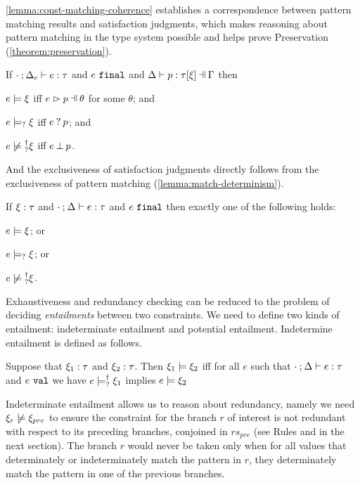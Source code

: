 \autoref{lemma:const-matching-coherence} establishes a correspondence
between pattern matching results and satisfaction judgments, which makes
reasoning about pattern matching in the type system possible and helps prove Preservation (\autoref{theorem:preservation}).

\begin{lemma}
  \label{lemma:const-matching-coherence}
  If $\cdot \mathbin{;} \Delta_e \vdash e : \tau$ and $e ~\mathtt{final}$ and $\chpattyp{p}{\tau}{\xi}{\Gamma}{\Delta}$ then
  \begin{enumerate*}
  \item $e \models \xi$ iff $\hpatmatch{e}{p}{\theta}$ for some $\theta$; and 
  \item $e \models_{?} \xi$ iff $e \mathbin{?} p$; and 
  \item $\cnotsatisfyormay{e}{\xi}$ iff $e \mathbin{\bot} p$.
  \end{enumerate*}
\end{lemma}

And the exclusiveness of satisfaction judgments directly follows from the exclusiveness of pattern matching (\autoref{lemma:match-determinism}).
\begin{theorem}
  \label{theorem:exclusive-constraint-satisfaction}
  If $\xi : \tau$ and $\cdot \mathbin{;} \Delta \vdash e : \tau$ and $e ~\mathtt{final}$ then exactly one of the following holds:
  \begin{enumerate*}
  \item $e \models \xi$; or
  \item $e \models_{?} \xi$; or 
  \item $\cnotsatisfyormay{e}{\xi}$.
  \end{enumerate*}
\end{theorem}

Exhaustiveness and redundancy checking can be reduced to the problem of deciding \emph{entailments} between two constraints. We need to define two kinds of entailment: indeterminate entailment and potential entailment.
Indetermine entailment is defined as follows.
\begin{definition}
  \label{definition:const-entailment}
  Suppose that $\xi_1 : \tau$ and $\xi_2 : \tau$.
  Then $\xi_1 \models \xi_2$ iff for all $e$ such that $\cdot \mathbin{;} \Delta \vdash e : \tau$ and $e ~\mathtt{val}$ we have $e \models_{?}^{\dag} \xi_1$ implies $e \models \xi_2$
\end{definition}
Indeterminate entailment allows us to reason about redundancy, namely we need $\cnotsatisfy{\xi_r}{\xi_{pre}}$ to ensure the constraint for the branch $r$ of interest is not redundant with respect to its preceding branches, conjoined in $rs_{pre}$ (see Rules \TOneRules and \TRules in the next section).
The branch $r$ would never be taken only when for all values that determinately or indeterminately match the pattern in $r$, they determinately match the pattern in one of the previous branches.


